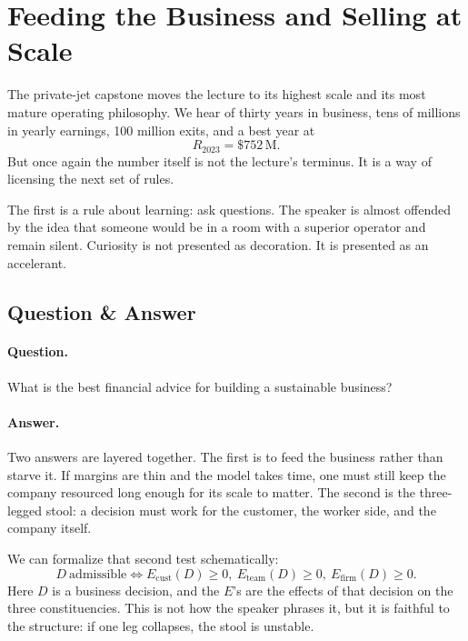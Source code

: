 \section{Feeding the Business and Selling at Scale}

The private-jet capstone moves the lecture to its highest scale and its most mature operating philosophy. We hear of thirty years in business, tens of millions in yearly earnings, \text{\$}100 million exits, and a best year at
\begin{equation}
R_{2023}=\text{\$}752\,\mathrm{M}.
\end{equation}
But once again the number itself is not the lecture's terminus. It is a way of licensing the next set of rules.

The first is a rule about learning: ask questions. The speaker is almost offended by the idea that someone would be in a room with a superior operator and remain silent. Curiosity is not presented as decoration. It is presented as an accelerant.

\subsection{Question \& Answer}

\paragraph{Question.} What is the best financial advice for building a sustainable business?

\paragraph{Answer.} Two answers are layered together. The first is to feed the business rather than starve it. If margins are thin and the model takes time, one must still keep the company resourced long enough for its scale to matter. The second is the three-legged stool: a decision must work for the customer, the worker side, and the company itself.

We can formalize that second test schematically:
\begin{equation}
D\ \text{admissible}
\iff
E_{\mathrm{cust}}(D)\ge 0,\ 
E_{\mathrm{team}}(D)\ge 0,\ 
E_{\mathrm{firm}}(D)\ge 0.
\end{equation}
Here \(D\) is a business decision, and the \(E\)'s are the effects of that decision on the three constituencies. This is not how the speaker phrases it, but it is faithful to the structure: if one leg collapses, the stool is unstable.

